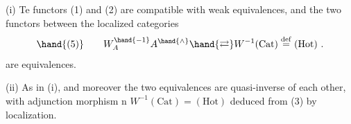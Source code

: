 (i) Te functors (1) and (2) are compatible with weak equivalences,
and the two  functors between the localized categories
\[ \hand{(5)} \qquad W_A^{\hand{-1}} A^{\hand{\wedge}} \hand{\rightleftarrows} W^{-1}(\mathrm{Cat}) \overset{\mathrm{def}}{=} (\mathrm{Hot}) \ . \]
are equivalences.

(ii) As in (i), and moreover the two equivalences are quasi-inverse of
each other, with adjunction morphism n  $W^{-1}(\mathrm{Cat}) = (\mathrm{Hot})$
deduced from (3) by localization.

